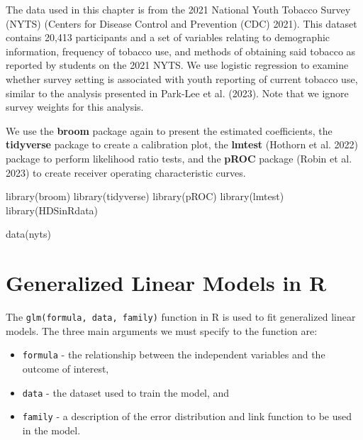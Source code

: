 \documentclass[
  letterpaper,
]{latex/krantz}
\makeatletter
\newenvironment{Shaded}{\begin{snugshade}}{\end{snugshade}}
\newcommand{\FunctionTok}[1]{\textcolor[rgb]{0.28,0.35,0.67}{#1}}
\newcommand{\NormalTok}[1]{\textcolor[rgb]{0.00,0.23,0.31}{#1}}
\providecommand{\tightlist}{%
  \setlength{\itemsep}{0pt}\setlength{\parskip}{0pt}}\usepackage{longtable,booktabs,array}
\newenvironment{kframe}{%
\medskip{}
\setlength{\fboxsep}{.8em}
 \def\at@end@of@kframe{}%
 \ifinner\ifhmode%
  \def\at@end@of@kframe{\end{minipage}}%
  \begin{minipage}{\columnwidth}%
 \fi\fi%
 \def\FrameCommand##1{\hskip\@totalleftmargin \hskip-\fboxsep
 \colorbox{shadecolor}{##1}\hskip-\fboxsep
     \hskip-\linewidth \hskip-\@totalleftmargin \hskip\columnwidth}%
 \MakeFramed {\advance\hsize-\width
   \@totalleftmargin\z@ \linewidth\hsize
   \@setminipage}}%
 {\par\unskip\endMakeFramed%
 \at@end@of@kframe}
\renewenvironment{Shaded}{\begin{kframe}}{\end{kframe}}
\makeatother
\begin{document}
The data used in this chapter is from the 2021 National Youth Tobacco
Survey (NYTS) (Centers for Disease
Control and Prevention (CDC) 2021). This dataset contains 20,413
participants and a set of variables relating to demographic information,
frequency of tobacco use, and methods of obtaining said tobacco as
reported by students on the 2021 NYTS. We use logistic regression to
examine whether survey setting is associated with youth reporting of
current tobacco use, similar to the analysis presented in Park-Lee et
al. (2023). Note that we ignore survey weights for this analysis.

We use the \textbf{broom} package  again to
present the estimated coefficients, the \textbf{tidyverse}
package to create a calibration plot, the
\textbf{lmtest} (Hothorn et al. 2022) package
to perform likelihood ratio tests, and the \textbf{pROC}
package (Robin et al. 2023) to create receiver
operating characteristic curves.

\begin{Shaded}
\begin{Highlighting}[]
\FunctionTok{library}\NormalTok{(broom)}
\FunctionTok{library}\NormalTok{(tidyverse)}
\FunctionTok{library}\NormalTok{(pROC)}
\FunctionTok{library}\NormalTok{(lmtest)}
\FunctionTok{library}\NormalTok{(HDSinRdata)}

\FunctionTok{data}\NormalTok{(nyts)}
\end{Highlighting}
\end{Shaded}

\section{\texorpdfstring{Generalized Linear Models in R
}{Generalized Linear Models in R }}\label{generalized-linear-models-in-r}

The \texttt{glm(formula,\ data,\ family)}
function in R is used to fit
generalized linear models. The three main arguments we must specify to
the function are:

\begin{itemize}
\tightlist
\item
  \texttt{formula} - the relationship between the independent variables
  and the outcome of interest,\\
\item
  \texttt{data} - the dataset used to train the model, and\\
\item
  \texttt{family} - a description of the error distribution and link
  function to be used in the model.
\end{itemize}
\end{document}
